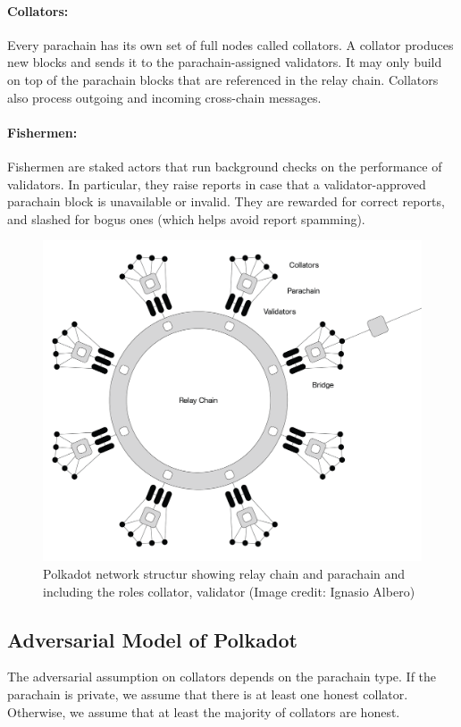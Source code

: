 \paragraph{Collators: } Every parachain has its own set of full nodes called collators. 
A collator produces new blocks and sends it to the parachain-assigned validators. 
It may only build on top of the parachain blocks that are referenced in the relay chain. 
Collators also process outgoing and incoming cross-chain messages.

\paragraph{Fishermen:} Fishermen are staked actors that run background checks on the performance of validators. 
In particular, they raise reports in case that a validator-approved parachain block is unavailable or invalid. 
They are rewarded for correct reports, and slashed for bogus ones (which helps avoid report spamming).


\begin{figure}[h]
	\centering
	\includegraphics[width=.7\textwidth]{images/Network@2x.png}
	\caption{Polkadot network structur showing relay chain and parachain and including the roles collator, validator (Image credit: Ignasio Albero)}
	\label{fig:?}
\end{figure}

\subsection{Adversarial Model of Polkadot}

The adversarial assumption on collators depends on the parachain type. If the parachain is private, 
we assume that there is at least one honest collator. 
Otherwise, we assume that at least the majority of collators are honest.

